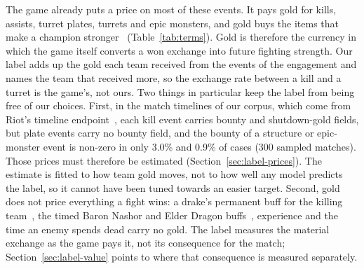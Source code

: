 The game already puts a price on most of these events. It pays gold for kills, assists, turret
plates, turrets and epic monsters, and gold buys the items that make a champion
stronger~\cite{lolwiki2026gold} (Table~\ref{tab:terms}). Gold is therefore the currency in which the
game itself converts a won exchange into future fighting strength. Our label adds up the gold each
team received from the events of the engagement and names the team that received more, so the
exchange rate between a kill and a turret is the game's, not ours. Two things in particular keep the
label from being free of our choices. First, in the match timelines of our corpus, which come from
Riot's timeline endpoint~\cite{riotapi2024timeline}, each kill event carries bounty and shutdown-gold
fields, but plate events carry no bounty field, and the bounty of a structure or epic-monster event is
non-zero in only 3.0\% and 0.9\% of cases (300 sampled matches). Those prices must therefore be
estimated (Section~\ref{sec:label-prices}). The estimate is fitted to how team gold moves, not to how
well any model predicts the label, so it cannot have been tuned towards an easier target. Second, gold
does not price everything a fight wins: a drake's permanent buff for the killing
team~\cite{lolwiki2026dragonslayer}, the timed Baron Nashor and Elder Dragon
buffs~\cite{lolwiki2026baron,lolwiki2026elderdragon}, experience and the time an enemy spends dead carry
no gold. The label measures the material exchange
as the game pays it, not its consequence for the match; Section~\ref{sec:label-value} points to where
that consequence is measured separately.

